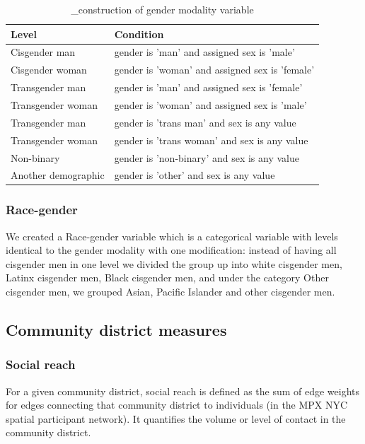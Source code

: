 \documentclass[
  letterpaper,
  DIV=11,
  numbers=noendperiod,
  oneside]{scrreprt}
\begin{document}
\hypertarget{tbl-gendermodality}{}
\begin{longtable}{ll}
\caption{\label{tbl-gendermodality}\_construction of gender modality variable }\tabularnewline

\toprule
Level & Condition \\ 
\midrule\addlinespace[2.5pt]
Cisgender man & gender is 'man' and assigned sex is 'male'  \\ 
Cisgender woman & gender is 'woman' and assigned sex is 'female' \\ 
Transgender man & gender is 'man' and assigned sex is 'female' \\ 
Transgender woman & gender is 'woman' and assigned sex is 'male' \\ 
Transgender man & gender is 'trans man' and sex is any value \\ 
Transgender woman & gender is 'trans woman' and sex is any value \\ 
Non-binary & gender is 'non-binary' and sex is any value \\ 
Another demographic & gender is 'other' and sex is any value \\ 
\bottomrule
\end{longtable}

\hypertarget{race-gender}{%
\subsubsection{Race-gender}\label{race-gender}}

We created a Race-gender variable which is a categorical variable with
levels identical to the gender modality with one modification: instead
of having all cisgender men in one level we divided the group up into
white cisgender men, Latinx cisgender men, Black cisgender men, and
under the category Other cisgender men, we grouped Asian, Pacific
Islander and other cisgender men.

\hypertarget{community-district-measures}{%
\subsection{Community district
measures}\label{community-district-measures}}

\hypertarget{social-reach}{%
\subsubsection{Social reach}\label{social-reach}}

For a given community district, social reach is defined as the sum of
edge weights for edges connecting that community district to individuals
(in the MPX NYC spatial participant network). It quantifies the volume
or level of contact in the community district.
\end{document}
